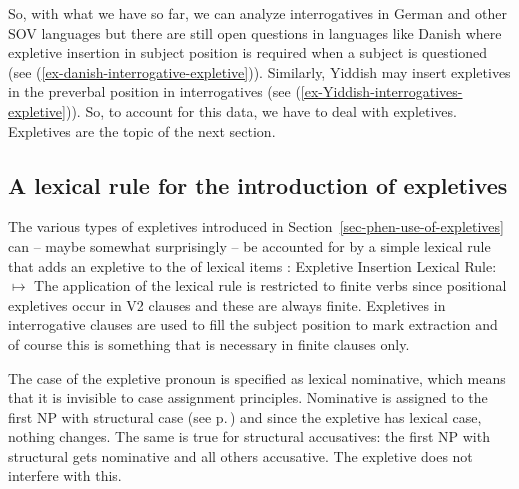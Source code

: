 So, with what we have so far, we can analyze interrogatives in German and other SOV languages but
there are still open questions in languages like Danish where expletive insertion in subject
position is required when a subject is questioned (see
(\ref{ex-danish-interrogative-expletive})). Similarly, Yiddish may insert expletives in the
preverbal position in interrogatives (see (\ref{ex-Yiddish-interrogatives-expletive})). So, to
account for this data, we have to deal with expletives. Expletives are the topic of the next section.



\subsection{A lexical rule for the introduction of expletives}
\label{sec-analysis-expletives}

The various types of expletives introduced in Section~\ref{sec-phen-use-of-expletives} can -- maybe somewhat surprisingly -- be
accounted for by a simple lexical rule that adds an expletive to the \argstl of lexical items
\citep[]{MOe2011a}:
\ea
\label{positional-expl-lr}
Expletive Insertion Lexical Rule:\\
 $\mapsto$
\z
The application of the lexical rule is restricted to finite verbs since positional expletives occur
in V2 clauses and these are always finite. Expletives in interrogative clauses are used to fill
the subject position to mark extraction and of course this is something that is necessary in finite
clauses only.

The case of the expletive pronoun is specified as lexical nominative, which means that it is
invisible to case assignment principles. Nominative is assigned to the first NP with structural case
(see p.\,\pageref{case-p}) and since the expletive has lexical case, nothing changes. The same is
true for structural accusatives: the first NP with structural gets nominative and all others
accusative. The expletive does not interfere with this.

